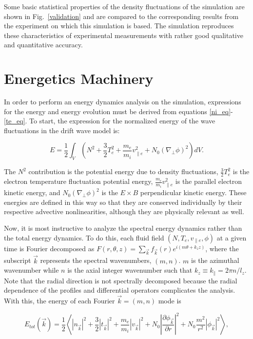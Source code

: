 \documentclass[showpacs,preprintnumbers,amsmath,amssymb,superscriptaddress]{revtex4}
\def\beq{\begin{equation}}
\def\eeq{\end{equation}}
\def\para{\parallel}
\newcommand{\pdiff}[2]{\frac{\partial#1}{\partial#2}}
\def\grad{\nabla}
\newcommand{\gradperp}{\grad_\perp}
\newcommand{\vpe}{v_{\parallel e}}
\begin{document}
Some basic statistical properties of the density fluctuations of the
simulation are shown in Fig.~\ref{validation} and are  compared to the corresponding results from the experiment on which
this simulation is based. The simulation reproduces these characteristics of experimental measurements with rather good qualitative and quantitative accuracy.

\section{Energetics Machinery}
\label{sec_energetics_machinery}

In order to perform an energy dynamics analysis on the simulation, expressions for the energy and energy evolution must be derived from equations \ref{ni_eq}-\ref{te_eq}.
To start, the expression for the normalized energy of the wave fluctuations in the drift wave model is:

\beq
\label{energy_eq}
E = \frac{1}{2} \int_V  (N^2 + \frac{3}{2} T_e^2 + \frac{m_e}{m_i} \vpe^2 + N_0 (\gradperp \phi)^2 ) dV.
\eeq

The $N^2$ contribution is the potential energy due to density fluctuations, $\frac{3}{2} T_e^2$ is the electron temperature fluctuation potential energy,
$\frac{m_e}{m_i} \vpe^2$ is the parallel electron kinetic energy, and $N_0 (\gradperp \phi)^2$ is the $E \times B$ perpendicular kinetic energy.
These energies are defined in this way so that they are conserved individually by their respective advective nonlinearities, although they are physically relevant as well.

Now, it is most instructive to analyze the spectral energy dynamics rather than the total energy dynamics. 
To do this, each fluid field $(N,T_e,\vpe,\phi)$ at a given time is Fourier decomposed as 
$F(r,\theta,z) = \sum_{\vec{k}} f_{\vec{k}}(r) e^{i (m \theta + k_z z )}$,
where the subscript $\vec{k}$ represents the spectral wavenumbers, $(m,n)$. 
$m$ is the azimuthal wavenumber while $n$ is the axial integer wavenumber such that $k_z \equiv k_\para = 2 \pi n/l_z$. 
Note that the radial direction is not spectrally decomposed because the radial dependence of the profiles and differential operators complicates the analysis.
With this, the energy of each Fourier $\vec{k} = (m,n)$ mode is

\beq
\label{E_k}
E_{tot}(\vec{k}) = \frac{1}{2} \left< |n_{\vec{k}}|^2 + \frac{3}{2} |t_{\vec{k}}|^2 + \frac{m_e}{m_i} |v_{\vec{k}}|^2 + N_0 \left| \pdiff{\phi_{\vec{k}}}{r} \right|^2 + N_0 \frac{m^2}{r^2} |\phi_{\vec{k}}|^2 \right>,
\eeq
\end{document}
